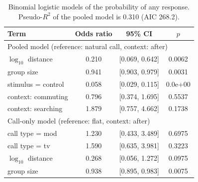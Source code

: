 \begin{table}[!ht]
\centering
\caption{Binomial logistic models of the probability of any response. Pseudo-$R^2$
of the pooled model is 0.310 (AIC 268.2).}
\label{tab:logit}
\footnotesize
\begin{tabular}{lccc}
\toprule
Term & Odds ratio & 95\% CI & $p$\\
\midrule
\multicolumn{4}{l}{Pooled model (reference: natural call, context: after)}\\
\quad $\log_{10}$ distance & 0.210 & [0.069, 0.642] & 0.0062\\
\quad group size & 0.941 & [0.903, 0.979] & 0.0031\\
\quad stimulus = control & 0.058 & [0.029, 0.115] & 0.0e+00\\
\quad context: commuting & 0.796 & [0.374, 1.695] & 0.5537\\
\quad context: searching & 1.879 & [0.757, 4.662] & 0.1738\\
\midrule
\multicolumn{4}{l}{Call-only model (reference: flat, context: after)}\\
\quad call type = mod & 1.230 & [0.433, 3.489] & 0.6975\\
\quad call type = tv & 1.590 & [0.635, 3.981] & 0.3223\\
\quad $\log_{10}$ distance & 0.268 & [0.056, 1.272] & 0.0975\\
\quad group size & 0.938 & [0.895, 0.983] & 0.0075\\
\bottomrule
\end{tabular}
\end{table}
